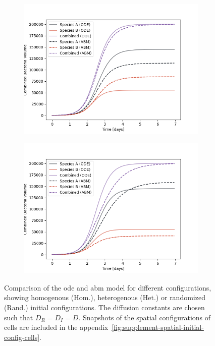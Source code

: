 \documentclass[10pt,A4paper]{article}
\numberwithin{equation}{section}
\begin{document}
\begin{figure}
\begin{subfigure}[c]{0.5\columnwidth}
    \end{subfigure}\\
    \begin{subfigure}[c]{0.5\columnwidth}
        \includegraphics[width=\columnwidth]{Figures/abm-inhomogenous/abm_ode_comparison.png}%
    \end{subfigure}%
    \begin{subfigure}[c]{0.5\columnwidth}
        \includegraphics[width=\columnwidth]{Figures/abm-random/abm_ode_comparison.png}%
    \end{subfigure}
    \caption{
        Comparison of the \ac{ode} and \ac{abm} model for different configurations, showing
        homogenous (Hom.), heterogenous (Het.) or randomized (Rand.) initial configurations.
        The diffusion constants are chosen such that $D_R=D_I=D$.
        Snapshots of the spatial configurations of cells are included in the appendix~\ref{fig:supplement-spatial-initial-config-cells}.
    }
    \label{fig:spatial-growth-curve}
\end{figure}
\end{document}
